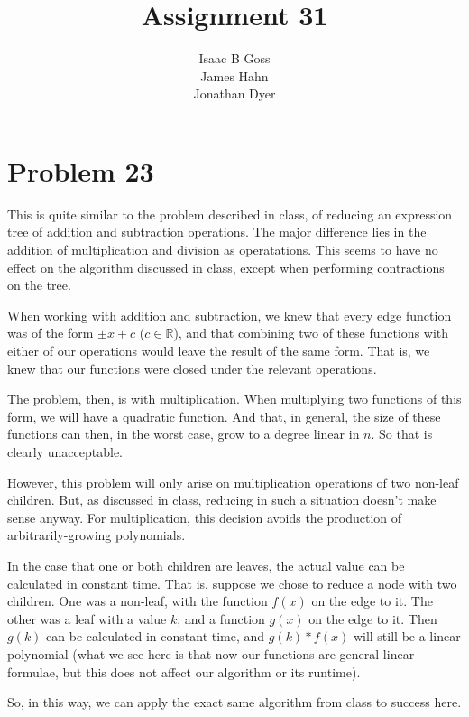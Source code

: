 \documentclass{article}
\author{Isaac B Goss\\ James Hahn\\ Jonathan Dyer}
\title{Assignment 31}
\providecommand{\prob}[1]{\section*{Problem #1}}
\providecommand{\R}{\mathbb{R}}
\begin{document}
\maketitle

\prob{23}
This is quite similar to the problem described in class, of reducing an expression tree of addition and subtraction operations.
The major difference lies in the addition of multiplication and division as operatations.
This seems to have no effect on the algorithm discussed in class, except when performing contractions on the tree.

When working with addition and subtraction, we knew that every edge function was of the form $\pm x + c$ ($c \in \R$), and that combining two of these functions with either of our operations would leave the result of the same form.
That is, we knew that our functions were closed under the relevant operations.

The problem, then, is with multiplication.
When multiplying two functions of this form, we will have a quadratic function.
And that, in general, the size of these functions can then, in the worst case, grow to a degree linear in $n$.
So that is clearly unacceptable.

However, this problem will only arise on multiplication operations of two non-leaf children.
But, as discussed in class, reducing in such a situation doesn't make sense anyway.
For multiplication, this decision avoids the production of arbitrarily-growing polynomials.

In the case that one or both children are leaves, the actual value can be calculated in constant time.
That is, suppose we chose to reduce a node with two children.
One was a non-leaf, with the function $f(x)$ on the edge to it.
The other was a leaf with a value $k$, and a function $g(x)$ on the edge to it.
Then $g(k)$ can be calculated in constant time, and $g(k)*f(x)$ will still be a linear polynomial
(what we see here is that now our functions are general linear formulae, but this does not affect our algorithm or its runtime).

So, in this way, we can apply the exact same algorithm from class to success here.
\end{document}

